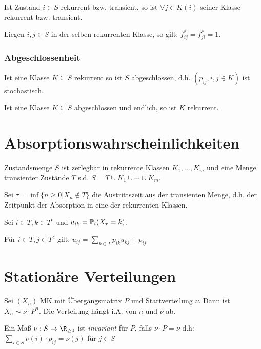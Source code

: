 Ist Zustand $i \in S$ rekurrent bzw. transient, so ist $\forall j \in K(i)$ seiner Klasse rekurrent bzw. transient.

\spacing

Liegen $i, j \in S$ in der selben rekurrenten Klasse, so gilt: $f_{ij}^* = f_{ji}^* = 1$.

\subsubsection*{Abgeschlossenheit}

Ist eine Klasse $K \subseteq S$ rekurrent so ist $S$ abgeschlossen, d.h. $(p_{ij}, i,j \in K)$ ist stochastisch.

\spacing

Ist eine Klasse $K \subseteq S$ abgeschlossen und endlich, so ist $K$ rekurrent.

\section*{Absorptionswahrscheinlichkeiten}

Zustandsmenge $S$ ist zerlegbar in rekurrente Klassen $K_1, \dots, K_m$ und eine Menge transienter Zustände $T$ s.d. $S = T \cup K_1 \cup \cdots \cup K_m$.

\vspace*{1mm}

Sei $\tau = \inf\{ n \geq 0 | X_n \notin T\}$ die Austrittszeit aus der transienten Menge, d.h. der Zeitpunkt der Absorption in eine der rekurrenten Klassen.

\vspace*{1mm}

Sei $i \in T, k \in T^c$ und $u_{ik} = \P_i(X_\tau = k)$.

\spacing

Für $i \in T, j \in T^c$ gilt: $u_{ij} = \displaystyle\sum_{k \in T} p_{ik} u_{kj} + p_{ij}$

\section*{Stationäre Verteilungen}

Sei $(X_n)$ MK mit Übergangsmatrix $P$ und Startverteilung $\nu$. Dann ist $X_n \sim \nu \cdot P^n$. Die Verteilung hängt i.A. von $n$ und $\nu$ ab.

\vspace*{1mm}

Ein Maß $\nu : S \to \R_{\geq 0}$ ist \emph{invariant} für $P$, falls $\nu \cdot P = \nu$ d.h: $\sum_{i \in S} \nu(i) \cdot p_{ij} = \nu(j)$ für $j \in S$

